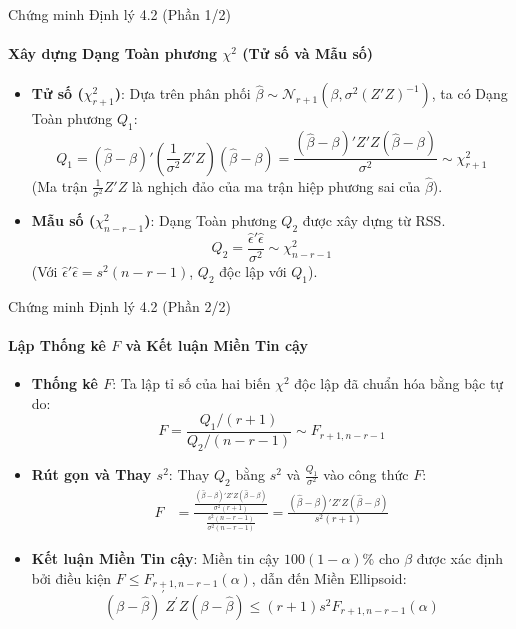 \begin{frame}{Chứng minh Định lý 4.2 (Phần 1/2)}
    \framesubtitle{Xây dựng Dạng Toàn phương $\chi^2$ (Tử số và Mẫu số)}

    \begin{itemize}
        \item \textbf{Tử số ($\chi^2_{r+1}$)}: Dựa trên phân phối $\hat{\beta} \sim \mathcal{N}_{r+1}(\beta, \sigma^2 (Z'Z)^{-1})$, ta có Dạng Toàn phương $Q_1$:
        \[
            Q_1 = (\hat{\beta}-\beta)' \left( \frac{1}{\sigma^2} Z'Z \right) (\hat{\beta}-\beta) = \frac{(\hat{\beta}-\beta)'Z'Z(\hat{\beta}-\beta)}{\sigma^2} \sim \chi^2_{r+1}
        \]
     (Ma trận $\frac{1}{\sigma^2} Z'Z$ là nghịch đảo của ma trận hiệp phương sai của $\hat{\beta}$).
        \item \textbf{Mẫu số ($\chi^2_{n-r-1}$)}: Dạng Toàn phương $Q_2$ được xây dựng từ RSS.
        \[
            Q_2 = \frac{\hat{\epsilon}'\hat{\epsilon}}{\sigma^2} \sim \chi^2_{n-r-1}
        \]
        (Với $\hat{\epsilon}'\hat{\epsilon} = s^2(n-r-1)$, $Q_2$ độc lập với $Q_1$).
    \end{itemize}
\end{frame}
\begin{frame}{Chứng minh Định lý 4.2 (Phần 2/2)}
    \framesubtitle{Lập Thống kê $F$ và Kết luận Miền Tin cậy}

    \begin{itemize}
        \item \textbf{Thống kê $F$}: Ta lập tỉ số của hai biến $\chi^2$ độc lập đã chuẩn hóa bằng bậc tự do:
        \[
            F = \frac{Q_1 / (r+1)}{Q_2 / (n-r-1)} \sim F_{r+1, n-r-1}
        \]

        \item \textbf{Rút gọn và Thay $s^2$}: Thay $Q_2$ bằng $s^2$ và $\frac{Q_1}{\sigma^2}$ vào công thức $F$:
        \begin{align*}
            F &= \frac{\frac{(\hat{\beta}-\beta)'Z'Z(\hat{\beta}-\beta)}{\sigma^2(r+1)}}{\frac{s^2(n-r-1)}{\sigma^2(n-r-1)}} = \frac{(\hat{\beta}-\beta)'Z'Z(\hat{\beta}-\beta)}{s^2(r+1)}
        \end{align*}

        \item \textbf{Kết luận Miền Tin cậy}: Miền tin cậy $100(1-\alpha)\%$ cho $\beta$ được xác định bởi điều kiện $F \le F_{r+1, n-r-1}(\alpha)$, dẫn đến Miền Ellipsoid:
        \[
            (\beta-\hat{\beta})^{\prime}Z^{\prime}Z(\beta-\hat{\beta})\le(r+1)s^{2}F_{r+1,n-r-1}(\alpha)
        \]
    \end{itemize}
\end{frame}


